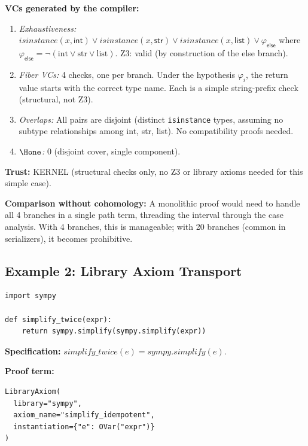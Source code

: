 \textbf{VCs generated by the compiler:}
\begin{enumerate}
\item \emph{Exhaustiveness:}
  $\mathit{isinstance}(x, \mathsf{int}) \vee
  \mathit{isinstance}(x, \mathsf{str}) \vee
  \mathit{isinstance}(x, \mathsf{list}) \vee
  \varphi_\mathsf{else}$
  where $\varphi_\mathsf{else} = \neg(\text{int} \vee \text{str}
  \vee \text{list})$.
  Z3: valid (by construction of the else branch).

\item \emph{Fiber VCs:} 4 checks, one per branch.  Under the
  hypothesis $\varphi_i$, the return value starts with the
  correct type name.  Each is a simple string-prefix check
  (structural, not Z3).

\item \emph{Overlaps:} All pairs are disjoint (distinct
  \texttt{isinstance} types, assuming no subtype relationships
  among int, str, list).  No compatibility proofs needed.

\item \emph{$\Hone$:} 0 (disjoint cover, single component).
\end{enumerate}

\textbf{Trust:} KERNEL (structural checks only, no Z3 or
library axioms needed for this simple case).

\textbf{Comparison without cohomology:}
A monolithic proof would need to handle all 4 branches in a single
path term, threading the interval through the case analysis.  With
4 branches, this is manageable; with 20 branches (common in
serializers), it becomes prohibitive.


\subsection{Example 2: Library Axiom Transport}
\label{sec:ex-sympy}

\begin{lstlisting}
import sympy

def simplify_twice(expr):
    return sympy.simplify(sympy.simplify(expr))
\end{lstlisting}

\textbf{Specification:}
$\mathit{simplify\_twice}(e) = \mathit{sympy.simplify}(e)$.

\textbf{Proof term:}
\begin{lstlisting}[language={}]
LibraryAxiom(
  library="sympy",
  axiom_name="simplify_idempotent",
  instantiation={"e": OVar("expr")}
)
\end{lstlisting}

